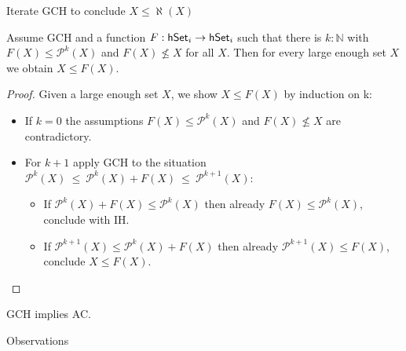 \documentclass[xcolor=dvipsnames,compress,aspectratio=169]{beamer}
\newcommand{\MBB}[1]{\ensuremath{\mathbb{#1}}\xspace}  %
\newcommand{\MCL}[1]{\ensuremath{\mathcal{#1}}\xspace} %
\newcommand{\Nat}{\MBB{N}}   %
\newcommand{\Pow}{\MCL P}
\begin{document}
\begin{frame}{Iterate GCH to conclude $X\le \aleph(X)$}

	\pause
	\begin{theorem}
		Assume GCH and a function $F:\mathsf{hSet}_i\to\mathsf{hSet}_i$ such that there is $k:\Nat$ with $F(X)\le \Pow^k(X)$ and $F(X)\not\le X$ for all $X$.
		Then for every large enough set $X$ we obtain $X\le F(X)$.
	\end{theorem}
	\vspace{-0.1cm}
	\pause
	\begin{proof}
		\pause
		Given a large enough set $X$, we show $X\le F(X)$ by induction on k:
		\begin{itemize}
			\vspace{0.2cm}
			\pause
			\item
			If $k=0$ the assumptions $F(X)\le \Pow^k(X)$ and $F(X)\not\le X$ are contradictory.
			\vspace{0.2cm}
			\pause
			\item
			For $k+1$ apply GCH to the situation $\Pow^{k}(X)~\le~ \Pow^{k}(X)+F(X)~\le~ \Pow^{k+1}(X)$:
			\begin{itemize}
			\vspace{0.2cm}
			\pause
			\item
			If $\Pow^{k}(X)+F(X)\le \Pow^{k}(X)$ then already $F(X)\le \Pow^{k}(X)$, conclude with IH.
			\vspace{0.2cm}
			\item
			\pause
			If $\Pow^{k+1}(X)\le \Pow^{k}(X)+F(X)$ then already $\Pow^{k+1}(X)\le F(X)$, conclude $X\le F(X)$.
			\qedhere
			\end{itemize}
		\end{itemize}
	\end{proof}
	\pause
	\vspace{-0.1cm}
	\begin{corollary}
		GCH implies AC.
	\end{corollary}
\end{frame}

\begin{frame}
	\Huge
	\centering
	Observations
\end{frame}
\end{document}
